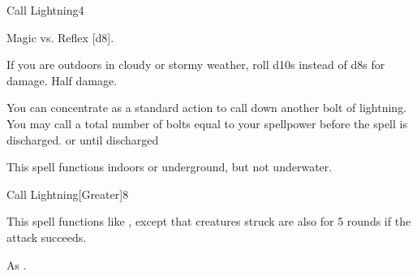 \begin{spellsection}{Call Lightning}{4}
    \begin{spellheader}
    \end{spellheader}
    \begin{spellcontent}
        \begin{spelltargetinginfo}
        \end{spelltargetinginfo}
        \begin{spelleffects}
            \begin{spellattack}{Magic vs. Reflex}
                \spellsuccess {}[d8].

                If you are outdoors in cloudy or stormy weather, roll d10s instead of d8s for damage.
                \spellfailure Half damage.
            \end{spellattack}
            \spelleffect You can concentrate as a standard action to call down another bolt of lightning. You may call a total number of bolts equal to your spellpower before the spell is discharged.
            \spelldur \durmed or until discharged \dismissable
        \end{spelleffects}
    \end{spellcontent}
    \begin{spellfooter}
        \spellnotes This spell functions indoors or underground, but not underwater. \destructivespellnotes
        \miscastexplode
    \end{spellfooter}
\end{spellsection}

\begin{spellsection}{Call Lightning}[Greater]{8}
    \begin{spellheader}
    \end{spellheader}
    \begin{spellcontent}
        \begin{spelltargetinginfo}
        \end{spelltargetinginfo}
        \begin{spelleffects}
            \spellspecial This spell functions like , except that creatures struck are also \staggered for 5 rounds if the attack succeeds.
        \end{spelleffects}
    \end{spellcontent}
    \begin{spellfooter}
        \spellnotes As .
        \miscastexplode
    \end{spellfooter}
\end{spellsection}

